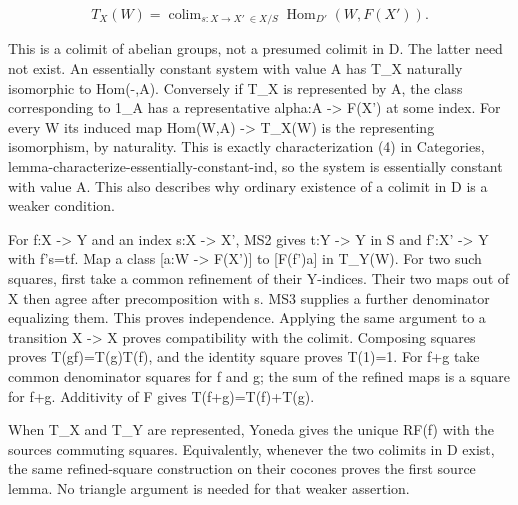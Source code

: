 \documentclass[11pt]{article}
\begin{document}
\[
 T_X(W)=\mathop{\operatorname{colim}}_{s:X\to X'\ \in X/S}
             \operatorname{Hom}_{D'}(W,F(X')).                 \tag{3.1}
\]

This is a colimit of abelian groups,\allowbreak{} not a presumed colimit in D\textquotesingle. The latter need not exist. An essentially constant system with value A has T\_\allowbreak{}X naturally isomorphic to Hom(-,\allowbreak{}A)\allowbreak{}. Conversely if T\_\allowbreak{}X is represented by A,\allowbreak{} the class corresponding to 1\_\allowbreak{}A has a representative alpha:\allowbreak{}A \allowbreak{}-> F(X')\allowbreak{} at some index. For every W its induced map Hom(W,\allowbreak{}A)\allowbreak{} \allowbreak{}-> T\_\allowbreak{}X(W)\allowbreak{} is the representing isomorphism,\allowbreak{} by naturality. This is exactly characterization (4)\allowbreak{} in Categories,\allowbreak{} lemma-characterize-essentially-constant-ind,\allowbreak{} so the system is essentially constant with value A. This also describes why ordinary existence of a colimit in D\textquotesingle{} is a weaker condition.

For f:\allowbreak{}X \allowbreak{}-> Y and an index s:\allowbreak{}X \allowbreak{}-> X',\allowbreak{} MS2 gives t:\allowbreak{}Y \allowbreak{}-> Y\textquotesingle{} in S and f':\allowbreak{}X' \allowbreak{}-> Y\textquotesingle{} with f's\allowbreak{}=tf. Map a class [a:\allowbreak{}W \allowbreak{}-> F(X')\allowbreak{}]\allowbreak{} to [F(f')\allowbreak{}a]\allowbreak{} in T\_\allowbreak{}Y(W)\allowbreak{}. For two such squares,\allowbreak{} first take a common refinement of their Y-indices. Their two maps out of X\textquotesingle{} then agree after precomposition with s. MS3 supplies a further denominator equalizing them. This proves independence. Applying the same argument to a transition X\textquotesingle{} \allowbreak{}-> X\textquotesingle\textquotesingle{} proves compatibility with the colimit. Composing squares proves T(gf)\allowbreak{}\allowbreak{}=T(g)\allowbreak{}T(f)\allowbreak{},\allowbreak{} and the identity square proves T(1)\allowbreak{}\allowbreak{}=1. For f\allowbreak{}+g take common denominator squares for f and g; the sum of the refined maps is a square for f\allowbreak{}+g. Additivity of F gives T(f\allowbreak{}+g)\allowbreak{}\allowbreak{}=T(f)\allowbreak{}\allowbreak{}+T(g)\allowbreak{}.

When T\_\allowbreak{}X and T\_\allowbreak{}Y are represented,\allowbreak{} Yoneda gives the unique RF(f)\allowbreak{} with the source\textquotesingle s commuting squares. Equivalently,\allowbreak{} whenever the two colimits in D\textquotesingle{} exist,\allowbreak{} the same refined-square construction on their cocones proves the first source lemma. No triangle argument is needed for that weaker assertion.
\end{document}
